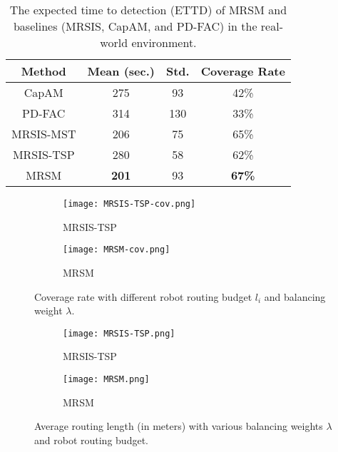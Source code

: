 \begin{table}[]
\centering
\caption{The expected time to detection (ETTD) of MRSM and baselines (MRSIS\cite{li2024mrsis}, CapAM\cite{paull2022learning}, and PD-FAC\cite{sheng2022pd}) in the real-world environment. }
\label{ETTD table in GEB}
\begin{tabular}{|c|c|c|c|}
\hline
Method                        & Mean (sec.)  & Std.  & Coverage Rate \\ \hline\hline
CapAM\cite{paull2022learning} & 275 & 93 & 42\% \\ \hline
PD-FAC\cite{sheng2022pd}      & 314 & 130 & 33\% \\ \hline
MRSIS-MST\cite{li2024mrsis}   & 206 & 75  & 65\% \\ \hline
MRSIS-TSP\cite{li2024mrsis}   & 280 & 58 & 62\% \\ \hline
MRSM                          & \textbf{201} & 93 & \textbf{67\%} \\ \hline
\end{tabular}
\end{table}


\begin{figure}
   \centering
   \begin{subfigure}[b]{0.45\textwidth}
       \texttt{[image: MRSIS-TSP-cov.png]}
       \caption{MRSIS-TSP\cite{li2024mrsis}}
   \end{subfigure}
   \hfill
   \quad
   \centering
   \begin{subfigure}[b]{0.45\textwidth}
       \texttt{[image: MRSM-cov.png]}
       \caption{MRSM}
   \end{subfigure}
   \hfill
   \caption{Coverage rate with different robot routing budget $l_i$ and balancing weight $\lambda$.}
   \label{fig:lbd-cov}
\end{figure}

\begin{figure}
   \centering
   \begin{subfigure}[b]{0.45\textwidth}
       \texttt{[image: MRSIS-TSP.png]}
       \caption{MRSIS-TSP\cite{li2024mrsis}}
   \end{subfigure}
   \hfill
   \quad
   \centering
   \begin{subfigure}[b]{0.45\textwidth}
       \texttt{[image: MRSM.png]}
       \caption{MRSM}
   \end{subfigure}
   \hfill
   \caption{Average routing length (in meters) with various balancing weights $\lambda$ and robot routing budget.}
   \label{fig:routing}
\end{figure}


